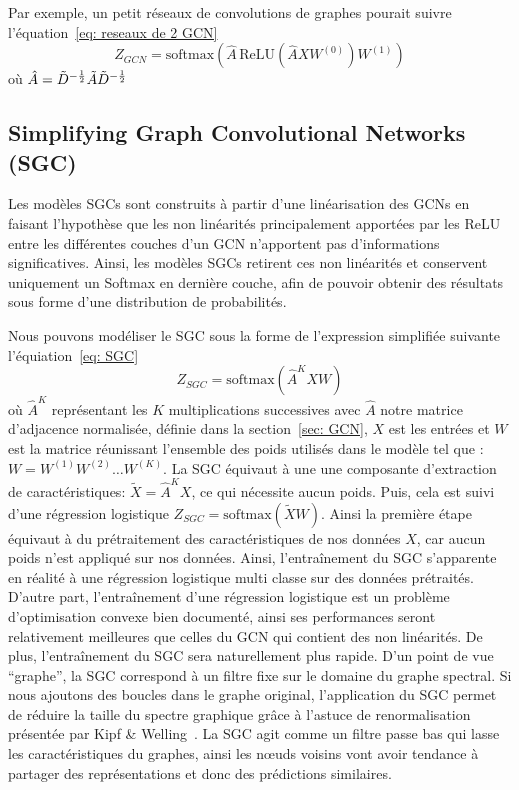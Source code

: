 \documentclass[a4paper]{article}
\begin{document}
Par exemple, un petit réseaux de convolutions de graphes pourait suivre l'équation~\ref{eq: reseaux de 2 GCN}
\begin{equation}
    Z_{GCN} = \text{softmax}(\hat{A}\,\text{ReLU}(\hat{A}XW^{(0)})W^{(1)})
    \label{eq: reseaux de 2 GCN}
\end{equation}
où $\hat{A} = \Tilde{D}^{-\frac{1}{2}} \Tilde{A} \Tilde{D}^{-\frac{1}{2}}$


\subsection{Simplifying Graph Convolutional Networks (SGC)}

Les modèles SGCs sont construits à partir d'une linéarisation des GCNs en faisant l'hypothèse que les non linéarités 
principalement apportées par les ReLU entre les différentes couches d'un GCN n'apportent pas d'informations significatives.
 Ainsi, les modèles SGCs retirent ces non linéarités et conservent uniquement un Softmax en dernière couche, afin de pouvoir 
 obtenir des résultats sous forme d'une distribution de probabilités.

Nous pouvons modéliser le SGC sous la forme de l'expression simplifiée suivante l'équiation~\ref{eq: SGC}
\begin{equation}
  Z_{SGC}=\text{softmax}(\hat{A}^KXW)
  \label{eq: SGC}
\end{equation}
où $\hat{A}^K$ représentant les $K$ multiplications successives avec $\hat{A}$ notre matrice d'adjacence normalisée,
définie dans la section~\ref{sec: GCN}, $X$ est les entrées 
et $W$ est la matrice réunissant l'ensemble des poids utilisés dans le modèle tel que : $W=W^{(1)} W^{(2)} \dots W^{(K)}$.
La SGC équivaut à une une composante d'extraction de caractéristiques: $\tilde{X}=\hat{A}^KX$, ce qui nécessite aucun 
poids. Puis, cela est suivi d'une régression logistique $Z_{SGC}=\text{softmax}(\tilde{X}W)$. Ainsi la première étape équivaut 
à du prétraitement des caractéristiques de nos données $X$, car aucun poids n'est appliqué sur nos données. Ainsi, l'entraînement
 du SGC s'apparente en réalité à une régression logistique multi classe sur des données prétraités. 
D'autre part, l'entraînement d'une régression logistique est un problème d'optimisation convexe bien documenté, ainsi ses 
performances seront relativement meilleures que celles du GCN qui contient des non linéarités. De plus, l'entraînement du 
SGC sera naturellement plus rapide.
D'un point de vue “graphe”, la SGC correspond à un filtre fixe sur le domaine du graphe spectral. Si nous ajoutons des boucles 
dans le graphe original, l'application du SGC permet de réduire la taille du spectre graphique grâce à l'astuce de renormalisation 
présentée par Kipf \& Welling~\cite{DBLP:journals/corr/KipfW16}. La SGC agit comme un filtre passe bas qui lasse les 
caractéristiques du graphes, ainsi les 
nœuds voisins vont avoir tendance à partager des représentations et donc des prédictions similaires. 
\end{document}
